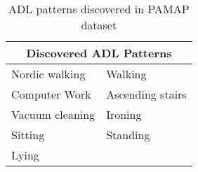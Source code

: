 \documentclass{sigchi}
\begin{document}
\begin{table}[htbp]
    \begin{tabular}{rr}
    \toprule
    \multicolumn{2}{c}{\textbf{Discovered ADL Patterns}} \\
    \midrule
    \multicolumn{1}{l}{Nordic walking} & \multicolumn{1}{l}{Walking} \\
    \multicolumn{1}{l}{Computer Work} & \multicolumn{1}{l}{Ascending stairs} \\   
    \multicolumn{1}{l}{Vacuum cleaning} & \multicolumn{1}{l}{Ironing} \\
    \multicolumn{1}{l}{Sitting} & \multicolumn{1}{l}{Standing} \\
    \multicolumn{1}{l}{Lying}
    \bottomrule
    \end{tabular}%
    \caption{ADL patterns discovered in PAMAP dataset}
  \label{tab: ADL patterns discovered pamap}%
\end{table}%
\end{document}
